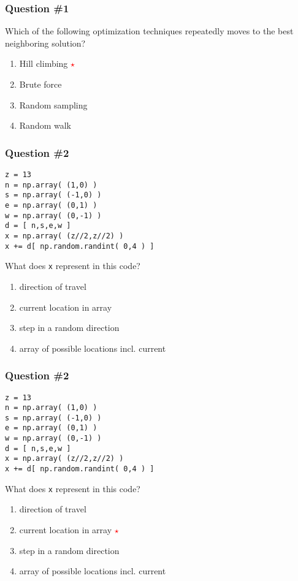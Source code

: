 \documentclass[11pt]{beamer}
\newcommand{\correctstar}{{\Large\textcolor{red}{$\star$}}}
\begin{document}
\begin{frame}[fragile]
  \frametitle{Question \#1}
  \Enlarge

Which of the following optimization techniques repeatedly moves to the best neighboring solution?

  \begin{enumerate}[label=\Alph*]
    \item  Hill climbing  \correctstar
    \item  Brute force
    \item  Random sampling
    \item  Random walk
  \end{enumerate}
\end{frame}

\begin{frame}[fragile]
  \frametitle{Question \#2}
  \Enlarge

  \begin{Verbatim}
z = 13
n = np.array( (1,0) )
s = np.array( (-1,0) )
e = np.array( (0,1) )
w = np.array( (0,-1) )
d = [ n,s,e,w ]
x = np.array( (z//2,z//2) )
x += d[ np.random.randint( 0,4 ) ]
  \end{Verbatim}

  What does \texttt{x} represent in this code?

  \begin{enumerate}[label=\Alph*]
    \item  direction of travel
    \item  current location in array
    \item  step in a random direction
    \item  array of possible locations incl. current
  \end{enumerate}
\end{frame}

\begin{frame}[fragile]
  \frametitle{Question \#2}
  \Enlarge

  \begin{Verbatim}
z = 13
n = np.array( (1,0) )
s = np.array( (-1,0) )
e = np.array( (0,1) )
w = np.array( (0,-1) )
d = [ n,s,e,w ]
x = np.array( (z//2,z//2) )
x += d[ np.random.randint( 0,4 ) ]
  \end{Verbatim}

  What does \texttt{x} represent in this code?

  \begin{enumerate}[label=\Alph*]
    \item  direction of travel
    \item  current location in array  \correctstar
    \item  step in a random direction
    \item  array of possible locations incl. current
  \end{enumerate}
\end{frame}
\end{document}
